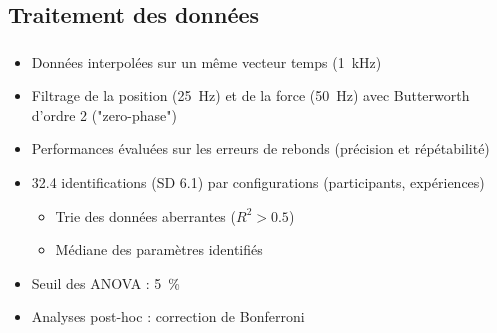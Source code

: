 \documentclass[10pt,xcolor=table]{beamer}
\begin{document}
\subsection{Traitement des données}
\begin{frame}
	\frametitle{\insertsubsection}
	\begin{itemize}
		\item<1-> Données interpolées sur un même vecteur temps (\SI{1}{\kilo\hertz})
		\item<2-> Filtrage de la position (\SI{25}{\hertz}) et de la force (\SI{50}{\hertz}) avec Butterworth d'ordre 2 ("zero-phase")
		\item<3-> Performances évaluées sur les erreurs de rebonds (précision et répétabilité)
		\item<4-> 32.4 identifications (SD 6.1) par configurations (participants, expériences)
		\begin{itemize}
			\item<5-> Trie des données aberrantes ($R^2 > 0.5$)
			\item<5-> Médiane des paramètres identifiés
		\end{itemize}
		\item<6-> Seuil des ANOVA : \SI{5}{\percent}
		\item<7-> Analyses post-hoc : correction de Bonferroni
	\end{itemize}
\end{frame}

\end{document}
